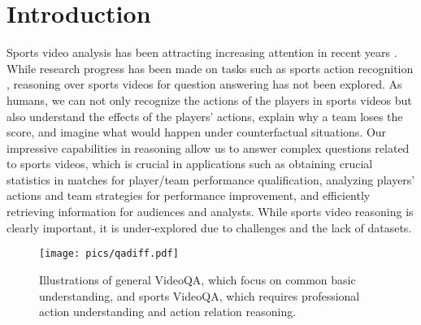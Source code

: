 \section{Introduction}

Sports video analysis has been attracting increasing attention in recent years
\citep{yuan2021spatio, li2021groupformer, koshkina2021contrastive, zhu2022fencenet, martin2020fine, wang2022shuttlenet,6516867}.
While research progress has been made on tasks such as
sports action recognition \citep{li2021multisports, zhu2022fencenet, rasmussen2022compressing}, reasoning over sports videos for question answering
has not been explored. As humans, we can not only recognize the actions of the players in sports videos but also understand the effects of the players' actions, explain why a team loses the score, and imagine what would happen under counterfactual situations. Our impressive capabilities in reasoning allow us to answer complex questions related to sports videos, which is crucial in applications such as obtaining crucial statistics in matches for player/team performance qualification, analyzing players' actions and team strategies for performance improvement, and efficiently retrieving information for audiences and analysts.
While sports video reasoning is clearly important, it is under-explored due to challenges and the lack of datasets.

\begin{figure}[tbp]
\centering
\texttt{[image: pics/qadiff.pdf]}
\caption{
Illustrations of general VideoQA, which focus on common basic understanding, and sports VideoQA, which requires professional action understanding and action relation reasoning\protect\footnotemark. 
}
\label{qadiff}
\end{figure}


